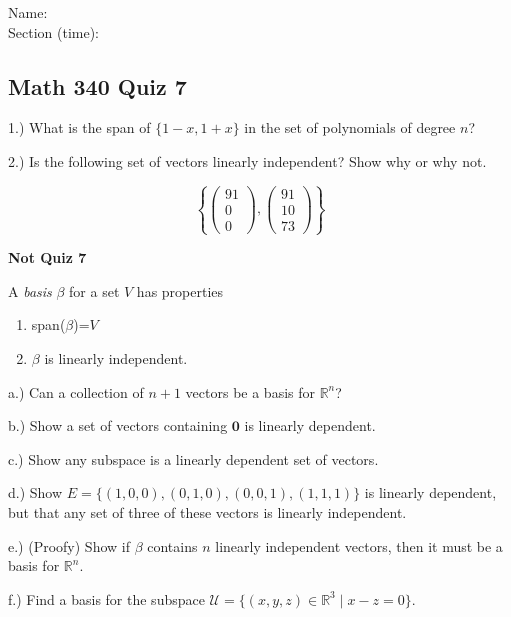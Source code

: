\documentclass{article}
\begin{document}
Name:\\
\medskip
Section (time):

\subsection*{Math 340 Quiz 7}

1.) What is the span of $\{1-x, 1+x\}$ in the set of polynomials of degree $n$?

2.) Is the following set of vectors linearly independent? Show why or why not.

$$\left\{ \left(\begin{array}{c}
91\\
0\\
0 \end{array}\right), \left(\begin{array}{c}
91\\
10\\
73 \end{array}\right)\right\}$$



\pagebreak

\textbf{Not Quiz 7}


A \emph{basis} $\beta$ for a set $V$ has properties

\begin{enumerate}
\item span($\beta$)=$V$
\item $\beta$ is linearly independent.
\end{enumerate}

a.) Can a collection of $n+1$ vectors be a basis for $\mathbb{R}^n$?

\bigskip{}
b.) Show a set of vectors containing $\mathbf{0}$ is linearly dependent.

\bigskip{}

c.) Show any subspace is a linearly dependent set of vectors.


\bigskip{}

d.) Show $E=\{(1,0,0), (0,1,0), (0,0,1), (1,1,1)\}$ is linearly dependent, but that any set of three of these vectors is linearly independent.

\bigskip{}

e.) (Proofy) Show if $\beta$ contains $n$ linearly independent vectors, then it must be a basis for $\mathbb{R}^n$.

\bigskip{}

f.) Find a basis for the subspace $\mathcal{U}=\{(x,y,z)\in \mathbb{R}^3 \mid x-z=0\}.$
\end{document}
